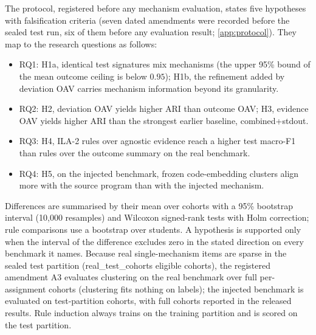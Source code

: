 The protocol, registered before any mechanism evaluation, states five hypotheses with falsification criteria (seven dated amendments were recorded before the sealed test run, six of them before any evaluation result; \cref{app:protocol}). They map to the research questions as follows:
\begin{itemize}
\item RQ1: H1a, identical test signatures mix mechanisms (the upper 95\% bound of the mean outcome ceiling is below $0.95$); H1b, the refinement added by deviation OAV carries mechanism information beyond its granularity.
\item RQ2: H2, deviation OAV yields higher ARI than outcome OAV; H3, evidence OAV yields higher ARI than the strongest earlier baseline, combined+stdout.
\item RQ3: H4, ILA-2 rules over agnostic evidence reach a higher test macro-F1 than rules over the outcome summary on the real benchmark.
\item RQ4: H5, on the injected benchmark, frozen code-embedding clusters align more with the source program than with the injected mechanism.
\end{itemize}
Differences are summarised by their mean over cohorts with a 95\% bootstrap interval (10{,}000 resamples) and Wilcoxon signed-rank tests with Holm correction; rule comparisons use a bootstrap over students. A hypothesis is supported only when the interval of the difference excludes zero in the stated direction on every benchmark it names. Because real single-mechanism items are sparse in the sealed test partition ({{real_test_cohorts}} eligible cohorts), the registered amendment A3 evaluates clustering on the real benchmark over full per-assignment cohorts (clustering fits nothing on labels); the injected benchmark is evaluated on test-partition cohorts, with full cohorts reported in the released results. Rule induction always trains on the training partition and is scored on the test partition.

